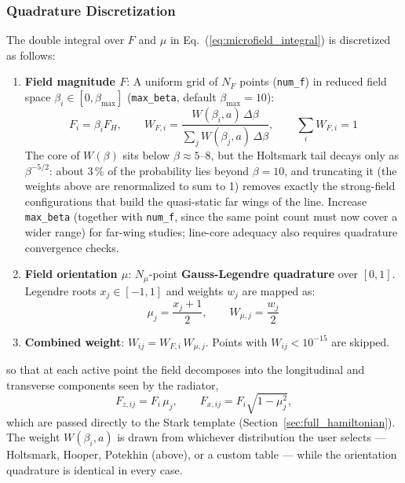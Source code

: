 \documentclass[11pt,a4paper]{article}
\numberwithin{equation}{section}
\begin{document}
\subsubsection{Quadrature Discretization}
The double integral over $F$ and $\mu$ in Eq.~(\ref{eq:microfield_integral}) is discretized as follows:
\begin{enumerate}
    \item \textbf{Field magnitude $F$}: A uniform grid of $N_F$ points (\texttt{num\_f}) in reduced field space $\beta_i \in [0, \beta_{\max}]$ (\texttt{max\_beta}, default $\beta_{\max} = 10$):
    \begin{equation}
    F_i = \beta_i F_H, \qquad W_{F,i} = \frac{W(\beta_i,a)\,\Delta\beta}{\sum_j W(\beta_j,a)\,\Delta\beta},
    \qquad \sum_i W_{F,i} = 1
    \end{equation}
    The core of $W(\beta)$ sits below $\beta \approx 5$--$8$, but the Holtsmark tail decays only as
    $\beta^{-5/2}$: about 3\,\% of the probability lies beyond $\beta = 10$, and truncating it (the
    weights above are renormalized to sum to 1) removes exactly the strong-field configurations that
    build the quasi-static far wings of the line.  Increase \texttt{max\_beta} (together with
    \texttt{num\_f}, since the same point count must now cover a wider range) for far-wing studies;
    line-core adequacy also requires quadrature convergence checks.
    \item \textbf{Field orientation $\mu$}: $N_\mu$-point \textbf{Gauss-Legendre quadrature} over $[0, 1]$. Legendre roots $x_j \in [-1,1]$ and weights $w_j$ are mapped as:
    \begin{equation}
    \mu_j = \frac{x_j + 1}{2}, \qquad W_{\mu,j} = \frac{w_j}{2}
    \end{equation}
    \item \textbf{Combined weight}: $W_{ij} = W_{F,i}\,W_{\mu,j}$. Points with $W_{ij} < 10^{-15}$ are skipped.
\end{enumerate}
so that at each active point the field decomposes into the longitudinal and transverse components seen by the radiator,
\begin{equation}
F_{z,ij} = F_i\,\mu_j, \qquad F_{x,ij} = F_i\sqrt{1 - \mu_j^2},
\end{equation}
which are passed directly to the Stark template (Section~\ref{sec:full_hamiltonian}). The weight $W(\beta_i, a)$ is drawn from whichever distribution the user selects — Holtsmark, Hooper, Potekhin (above), or a custom table — while the orientation quadrature is identical in every case.
\end{document}
